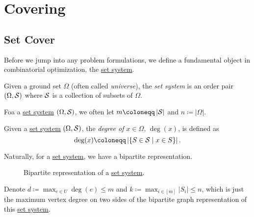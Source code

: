 \chapter{Covering}\label{ch:covering}

\section{Set Cover}

Before we jump into any problem formulations, we define a fundamental object in combinatorial optimization, the \hyperref[def:set-system]{set system}.

\begin{definition}\label{def:set-system}
	Given a ground set \(\Omega\) (often called \emph{universe}), the \emph{set system} is an order pair \((\Omega , \mathcal{\MakeUppercase{S}} )\) where \(\mathcal{\MakeUppercase{S}} \) is a collection of subsets of \(\Omega\).
\end{definition}

\begin{note}
	Foa a \hyperref[def:set-system]{set system} \((\Omega , \mathcal{\MakeUppercase{S}} )\), we often let \(m\coloneqq \left\vert \mathcal{\MakeUppercase{S}}  \right\vert \) and \(n\coloneqq \left\vert \Omega  \right\vert \).
\end{note}

\begin{definition}[Degree]\label{def:degree}
	Given a \hyperref[def:set-system]{set system} \((\Omega , \mathcal{\MakeUppercase{S}} )\), the \emph{degree of \(x\in \Omega\)}, \(\deg(x)\), is defined as
	\[
		\deg(x) \coloneqq \left\vert \left\{ S\in \mathcal{\MakeUppercase{S}} \mid x\in S \right\}  \right\vert.
	\]
\end{definition}

\begin{remark}
	Naturally, for a \hyperref[def:set-system]{set system}, we have a bipartite representation.
	\begin{figure}[H]
		\centering
		\caption{Bipartite representation of a \hyperref[def:set-system]{set system}.}
		\label{fig:set-system-bip}
	\end{figure}

	Denote \(d \coloneqq \max _{e\in U}\deg(e)\leq m\) and \(k \coloneqq \max _{i\in [m]}\left\vert S_i \right\vert \leq n\), which is just the maximum vertex degree on two sides of the bipartite graph representation of this \hyperref[def:set-system]{set system}.
\end{remark}

